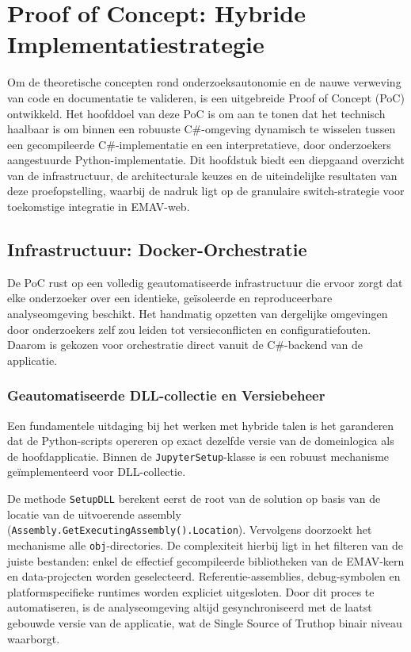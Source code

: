 \chapter{Proof of Concept: Hybride Implementatiestrategie}
\label{ch:poc}

Om de theoretische concepten rond onderzoeksautonomie en de nauwe verweving van code en documentatie te valideren, is een uitgebreide Proof of Concept (PoC) ontwikkeld. Het hoofddoel van deze PoC is om aan te tonen dat het technisch haalbaar is om binnen een robuuste C\#-omgeving dynamisch te wisselen tussen een gecompileerde C\#-implementatie en een interpretatieve, door onderzoekers aangestuurde Python-implementatie. Dit hoofdstuk biedt een diepgaand overzicht van de infrastructuur, de architecturale keuzes en de uiteindelijke resultaten van deze proefopstelling, waarbij de nadruk ligt op de granulaire switch-strategie voor toekomstige integratie in EMAV-web.

\section{Infrastructuur: Docker-Orchestratie}

De PoC rust op een volledig geautomatiseerde infrastructuur die ervoor zorgt dat elke onderzoeker over een identieke, geïsoleerde en reproduceerbare analyseomgeving beschikt. Het handmatig opzetten van dergelijke omgevingen door onderzoekers zelf zou leiden tot versieconflicten en configuratiefouten. Daarom is gekozen voor orchestratie direct vanuit de C\#-backend van de applicatie.

\subsection{Geautomatiseerde DLL-collectie en Versiebeheer}
Een fundamentele uitdaging bij het werken met hybride talen is het garanderen dat de Python-scripts opereren op exact dezelfde versie van de domeinlogica als de hoofdapplicatie. Binnen de \texttt{JupyterSetup}-klasse is een robuust mechanisme geïmplementeerd voor DLL-collectie. 

De methode \texttt{SetupDLL} berekent eerst de root van de solution op basis van de locatie van de uitvoerende assembly (\nolinkurl{Assembly.GetExecutingAssembly().Location}). Vervolgens doorzoekt het mechanisme alle \texttt{obj}-directories. De complexiteit hierbij ligt in het filteren van de juiste bestanden: enkel de effectief gecompileerde bibliotheken van de EMAV-kern en data-projecten worden geselecteerd. Referentie-assemblies, debug-symbolen en platformspecifieke runtimes worden expliciet uitgesloten. Door dit proces te automatiseren, is de analyseomgeving altijd gesynchroniseerd met de laatst gebouwde versie van de applicatie, wat de \textquotedbl Single Source of Truth\textquotedbl \@ op binair niveau waarborgt.

